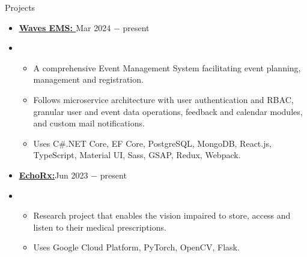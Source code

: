 \documentclass{resume}
\begin{document}
\vspace{-0.5\baselineskip}


\begin{rSection}{Projects}
      \begin{itemize}[label=\null, leftmargin=*, parsep=0.5em]
            \item {
                  \textbf{\href{https://github.com/AdwayB/waves}{\underline{Waves EMS}: }}\hfill Mar 2024 $-$ present
                  } \\
            \item {
                  \vspace{-1.2\baselineskip}
                  \begin{itemize}[label=$\bullet$]
                        \vspace{-\parskip}
                        \vspace{-\parsep}
                        \item {
                              A comprehensive Event Management System facilitating event planning, management and registration.
                              }
                        \item {
                              Follows microservice architecture with user authentication and RBAC, granular user and event data operations, feedback and calendar modules, and custom mail notifications.
                              }
                        \item {
                              Uses C\#\space.NET Core, EF Core, PostgreSQL, MongoDB, React.js, TypeScript, Material UI, Sass, GSAP, Redux, Webpack.
                              }
                  \end{itemize}
                  }


            \item {
                  \textbf{\href{https://github.com/AdwayB/EchoRx}{\underline{EchoRx}:}}\hfill Jun 2023 $-$ present
                  } \\
            \item {
                  \vspace{-1.2\baselineskip}
                  \begin{itemize}[label=$\bullet$]
                        \vspace{-\parskip}
                        \vspace{-\parsep}
                        \item {
                              Research project that enables the vision impaired to store, access and listen to their medical prescriptions.
                              }
                        \item {
                              Uses Google Cloud Platform, PyTorch, OpenCV, Flask.
                              }
                  \end{itemize}
                  }




\end{itemize}
\end{rSection}
\end{document}
